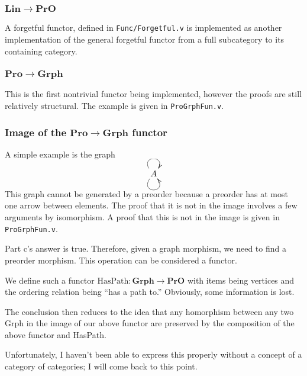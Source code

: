 \documentclass[12pt,twocolumn,oneside]{book}
\begin{document}
\subsubsection{$\mathbf{Lin} \to \mathbf{PrO}$}

A forgetful functor, defined in \texttt{Func/Forgetful.v} is implemented as another
implementation of the general forgetful functor from a full subcategory to its
containing category.

\subsubsection{$\mathbf{Pro} \to \mathbf{Grph}$}

This is the first nontrivial functor being implemented, however the proofs are
still relatively structural. The example is given in \texttt{ProGrphFun.v}.

\subsubsection{Image of the $\mathbf{Pro} \to \mathbf{Grph}$ functor}

A simple example is the graph

\begin{displaymath}
    \xymatrix{
         A \ar@(ul,ur) \ar@(dl,dr) }
\end{displaymath}

This graph cannot be generated by a preorder because a preorder has at most one arrow
between elements. The proof that it is not in the image involves a few arguments by
isomorphism. A proof that this is not in the image is given in \texttt{ProGrphFun.v}.

Part c's answer is true. Therefore, given a graph morphism, we need to find a preorder
morphism. This operation can be considered a functor.

We define such a functor $\mathrm{HasPath} : \mathbf{Grph} \to \mathbf{PrO}$ with items being vertices
and the ordering relation being ``has a path to.'' Obviously, some information is lost.

The conclusion then reduces to the idea that any homorphism between any two Grph
in the image of our above functor are preserved by the composition of the above
functor and HasPath.

Unfortunately, I haven't been able to express this properly without a concept of
a category of categories; I will come back to this point.

\end{document}

